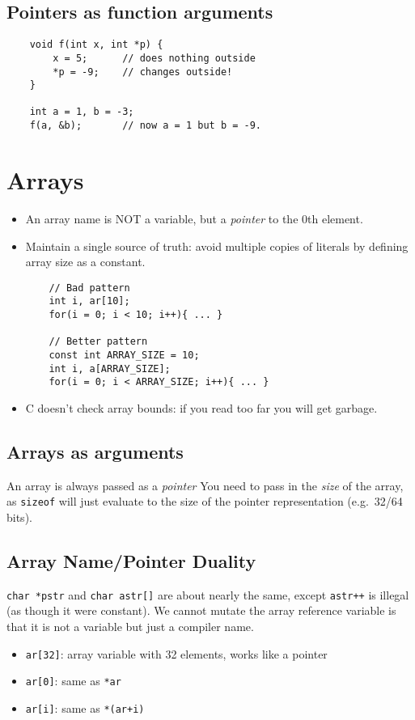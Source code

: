 \subsection{Pointers as function arguments}
\begin{verbatim}
    void f(int x, int *p) {
    	x = 5;      // does nothing outside
    	*p = -9;    // changes outside!
    }

    int a = 1, b = -3;
    f(a, &b);       // now a = 1 but b = -9.
\end{verbatim}

\section{Arrays}
\begin{itemize}
    \item An array name is NOT a variable, but a \emph{pointer} to the 0th element.
    \item Maintain a single source of truth: avoid multiple copies of literals by defining array size as a constant.
    \begin{verbatim}
    // Bad pattern
    int i, ar[10];
    for(i = 0; i < 10; i++){ ... }
    
    // Better pattern
    const int ARRAY_SIZE = 10;
    int i, a[ARRAY_SIZE];
    for(i = 0; i < ARRAY_SIZE; i++){ ... }
    \end{verbatim}
	\item C doesn't check array bounds: if you read too far you will get garbage.
\end{itemize}

\subsection{Arrays as arguments}
An array is always passed as a \emph{pointer} You need to pass in the \emph{size} of the array, as \texttt{sizeof} will just evaluate to the size of the pointer representation (e.g.~32/64 bits).

\subsection{Array Name/Pointer Duality}
\texttt{char *pstr} and \texttt{char astr[]} are about nearly the same, except \texttt{astr++} is illegal (as though it were constant). We cannot mutate the array reference variable is that it is not a variable but just a compiler name.
\begin{itemize}
    \item \texttt{ar[32]}: array variable with 32 elements, works like a pointer
    \item \texttt{ar[0]}: same as \texttt{*ar}
    \item \texttt{ar[i]}: same as \texttt{*(ar+i)}
\end{itemize} 

